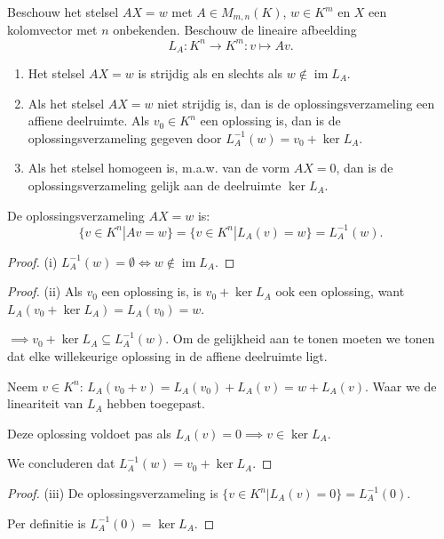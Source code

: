 \begin{lemma}[5.3.1]
    Beschouw het stelsel $AX = w$ met $A \in M_{m,n}(K)$, $w \in K^m$ en $X$ een kolomvector met $n$ onbekenden. Beschouw de lineaire afbeelding
    \[ L_A \colon K^n \to K^m \colon v \mapsto Av. \]
    \begin{enumerate}
        \item[(i)] Het stelsel $AX = w$ is strijdig als en slechts als $w \notin \operatorname{im} L_A$.
        \item[(ii)] Als het stelsel $AX = w$ niet strijdig is, dan is de oplossingsverzameling een affiene deelruimte. Als $v_0 \in K^n$ een oplossing is, dan is de oplossingsverzameling gegeven door $L_A^{-1}(w) = v_0 + \operatorname{ker} L_A$.
        \item[(iii)] Als het stelsel homogeen is, m.a.w. van de vorm $AX = 0$, dan is de oplossingsverzameling gelijk aan de deelruimte $\operatorname{ker} L_A$.
    \end{enumerate}
\end{lemma}
De oplossingsverzameling \(AX = w\) is:
\[
\{v\in K^n | Av = w\} = \{v \in K^n | L_A(v) = w\} = L_A^{-1}(w).
\]
\begin{proof}(i)
    \(L_A^{-1}(w) = \emptyset \iff w \notin \operatorname{im} L_A\).
\end{proof}
\begin{proof}(ii)
    Als \(v_0\) een oplossing is, is \(v_0 + \ker L_A \) ook een oplossing, want \(L_A (v_0 + \ker L_A) = L_A(v_0) =  w\).

    \(\implies    v_0 + \ker L_A \subseteq L_A^{-1}(w) \).
    Om de gelijkheid aan te tonen moeten we tonen dat elke willekeurige oplossing in de affiene deelruimte ligt.

    Neem \(v \in K^n\):
    \(L_A (v_0 + v) = L_A (v_0)  + L_A ( v) = w + L_A (v)\). Waar we de lineariteit van \(L_A\) hebben toegepast.

    Deze oplossing voldoet pas als \(L_A (v) = 0 \implies v \in \ker L_A \).

    We concluderen dat \(L_A^{-1}(w) = v_0 + \operatorname{ker} L_A\).

\end{proof}
\begin{proof}(iii)
    De oplossingsverzameling is \(\{v \in K^n | L_A(v) = 0\} = L_A^{-1}(0)\).

    Per definitie is \(  L_A^{-1}(0) = \ker L_A\).
\end{proof}

